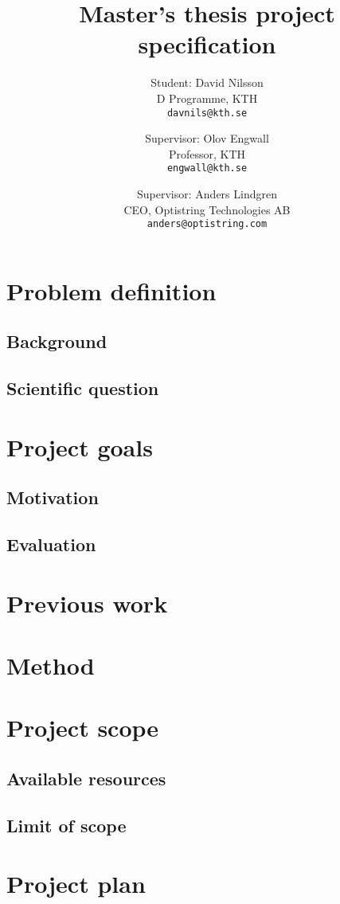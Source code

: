 \documentclass[a4paper,11pt]{article}
\title{Master's thesis project specification}
\author{
    Student: David Nilsson\\
    D Programme, KTH\\
    \texttt{davnils@kth.se}
    \and
    Supervisor: Olov Engwall\\
    Professor, KTH\\
    \texttt{engwall@kth.se}
    \and
    Supervisor: Anders Lindgren\\
    CEO, Optistring Technologies AB\\
    \texttt{anders@optistring.com}
}
\begin{document}
\maketitle

\section*{Problem definition}
\subsection*{Background}
\subsection*{Scientific question}

\section*{Project goals}
\subsection*{Motivation}
\subsection*{Evaluation}

\section*{Previous work}

\section*{Method}

\section*{Project scope}
\subsection*{Available resources}
\subsection*{Limit of scope}

\section*{Project plan}
\end{document}
